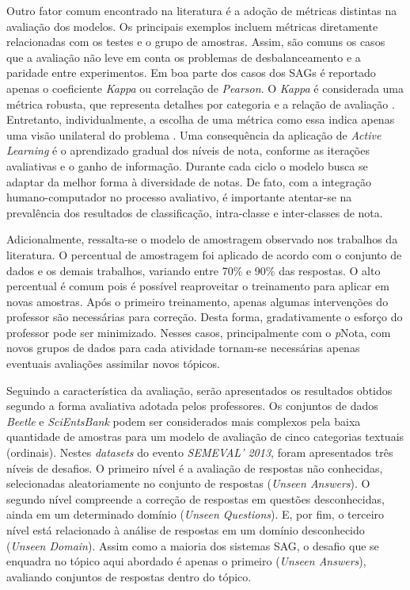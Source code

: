 Outro fator comum encontrado na literatura é a adoção de métricas distintas na avaliação dos modelos. Os principais exemplos incluem métricas diretamente relacionadas com os testes e o grupo de amostras. Assim, são comuns os casos que a avaliação não leve em conta os problemas de desbalanceamento e a paridade entre experimentos. Em boa parte dos casos dos SAGs é reportado apenas o coeficiente \textit{Kappa} ou correlação de \textit{Pearson}. O \textit{Kappa} é considerada uma métrica robusta, que representa detalhes por categoria e a relação de avaliação \cite{bendavid2008}. Entretanto, individualmente, a escolha de uma métrica como essa indica apenas uma visão unilateral do problema \cite{delgado2019}. Uma consequência da aplicação de \textit{Active Learning} é o aprendizado gradual dos níveis de nota, conforme as iterações avaliativas e o ganho de informação. Durante cada ciclo o modelo busca se adaptar da melhor forma à diversidade de notas. De fato, com a integração humano-computador no processo avaliativo, é importante atentar-se na prevalência dos resultados de classificação, intra-classe e inter-classes de nota. 

Adicionalmente, ressalta-se o modelo de amostragem observado nos trabalhos da literatura. O percentual de amostragem foi aplicado de acordo com o conjunto de dados e os demais trabalhos, variando entre 70\% e 90\% das respostas. O alto percentual é comum pois é possível reaproveitar o treinamento para aplicar em novas amostras. Após o primeiro treinamento, apenas algumas intervenções do professor são necessárias para correção. Desta forma, gradativamente o esforço do professor pode ser minimizado. Nesses casos, principalmente com o \textit{p}Nota, com novos grupos de dados para cada atividade tornam-se necessárias apenas eventuais avaliações assimilar novos tópicos.

Seguindo a característica da avaliação, serão apresentados os resultados obtidos segundo a forma avaliativa adotada pelos professores. Os conjuntos de dados \textit{Beetle} e \textit{SciEntsBank} podem ser considerados mais complexos pela baixa quantidade de amostras para um modelo de avaliação de cinco categorias textuais (ordinais). Nestes \textit{datasets} do evento \textit{SEMEVAL' 2013}, foram apresentados três níveis de desafios. O primeiro nível é a avaliação de respostas não conhecidas, selecionadas aleatoriamente no conjunto de respostas (\textit{Unseen Answers}). O segundo nível compreende a correção de respostas em questões desconhecidas, ainda em um determinado domínio (\textit{Unseen Questions}). E, por fim, o terceiro nível está relacionado à análise de respostas em um domínio desconhecido (\textit{Unseen Domain}). Assim como a maioria dos sistemas SAG, o desafio que se enquadra no tópico aqui abordado é apenas o primeiro (\textit{Unseen Answers}), avaliando conjuntos de respostas dentro do tópico. 

